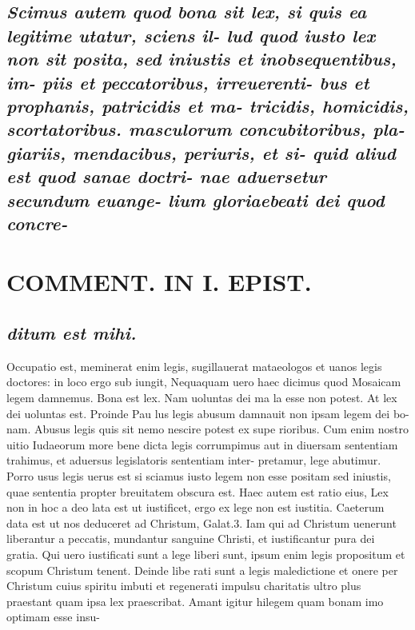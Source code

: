 \documentclass{article}
\begin{document}
\begin{pages}
\subsection*{\textit{Scimus autem quod bona sit lex, si quis ea legitime utatur, sciens il- lud quod iusto lex non sit posita, sed iniustis et inobsequentibus, im- piis et peccatoribus, irreuerenti- bus et prophanis, patricidis et ma- tricidis, homicidis, scortatoribus. masculorum concubitoribus, pla- giariis, mendacibus, periuris, et si- quid aliud est quod sanae doctri- nae aduersetur secundum euange- lium gloriaebeati dei quod concre- }}
\section*{COMMENT. IN I. EPIST. }
{}
\subsection*{\textit{ditum est mihi. }}\pstart Occupatio est, meminerat enim legis, sugillauerat mataeologos et uanos legis doctores: in loco ergo sub iungit, Nequaquam uero haec dicimus quod Mosaicam legem damnemus. Bona est lex. Nam uoluntas dei ma la esse non potest. At lex dei uoluntas est. Proinde Pau lus legis abusum damnauit non ipsam legem dei bo- nam. Abusus legis quis sit nemo nescire potest ex supe rioribus. Cum enim nostro uitio Iudaeorum more bene dicta legis corrumpimus aut in diuersam sententiam trahimus, et aduersus legislatoris sententiam inter- pretamur, lege abutimur. Porro usus legis uerus est si sciamus iusto legem non esse positam sed iniustis, quae sententia propter breuitatem obscura est. Haec autem est ratio eius, Lex non in hoc a deo lata est ut iustificet, ergo ex lege non est iustitia. Caeterum data est ut nos deduceret ad Christum, Galat.3. Iam qui ad Christum uenerunt liberantur a peccatis, mundantur sanguine Christi, et iustificantur pura dei gratia. Qui uero iustificati sunt a lege liberi sunt, ipsum enim legis propositum et scopum Christum tenent. Deinde libe rati sunt a legis maledictione et onere per Christum cuius spiritu imbuti et regenerati impulsu charitatis ultro plus praestant quam ipsa lex praescribat. Amant igitur hilegem quam bonam imo optimam esse insu-  \pend

\end{pages}
\end{document}
